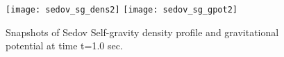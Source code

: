 \begin{figure}
{\leavevmode\texttt{[image: sedov\_sg\_dens2]}}
{\leavevmode\texttt{[image: sedov\_sg\_gpot2]}}
\caption{\label{Fig:Sedov_sg2} Snapshots of Sedov Self-gravity
density profile and gravitational potential at time t=1.0 sec.}

\end{figure}

\newpage


